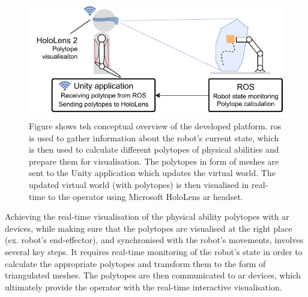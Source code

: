 \begin{figure}[!h]
    \centering
    \includegraphics[width=0.8\linewidth]{Papers/images/unity_visualisation.pdf}
    \caption{Figure shows teh conceptual overview of the developed platform. \gls{ros} is used to gather information about the robot's current state, which is then used to calculate different polytopes of physical abilities and prepare them for visualisation. The polytopes in form of meshes are sent to the Unity application which updates the virtual world. The updated virtual world (with polytopes) is then visualised in real-time to the operator using Microsoft HoloLens \gls{ar} headset.}
    \label{fig:unity_visual}
\end{figure}



Achieving the real-time visualisation of the physical ability polytopes with \gls{ar} devices, while making sure that the polytopes are visualised at the right place (ex. robot's end-effector), and synchronised with the robot's movements, involves several key steps. It requires real-time monitoring of the robot's state in order to calculate the appropriate polytopes and transform them to the form of triangulated meshes. The polytopes are then communicated to \gls{ar} devices, which ultimately provide the operator with the real-time interactive visualisation. 


